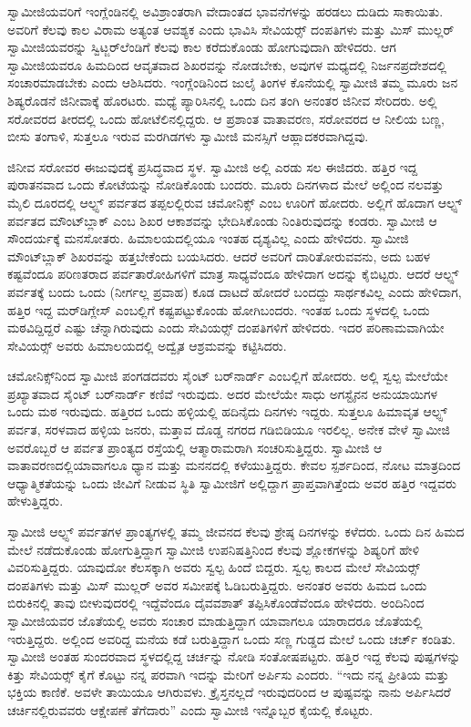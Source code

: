  ಸ್ವಾಮೀಜಿಯವರಿಗೆ ಇಂಗ್ಲೆಂಡಿನಲ್ಲಿ ಅವಿಶ್ರಾಂತರಾಗಿ ವೇದಾಂತದ ಭಾವನೆಗಳನ್ನು ಹರಡಲು ದುಡಿದು ಸಾಕಾಯಿತು. ಅವರಿಗೆ ಕೆಲವು ಕಾಲ ವಿರಾಮ ಅತ್ಯಂತ ಆವಶ್ಯಕ ಎಂದು ಭಾವಿಸಿ ಸೇವಿಯರ್ಸ್‍‍ ದಂಪತಿಗಳು ಮತ್ತು ಮಿಸ್ ಮುಲ್ಲರ್ ಸ್ವಾಮೀಜಿಯವರನ್ನು ಸ್ವಿಟ್ಜರ್‌ಲೆಂಡಿಗೆ ಕೆಲವು ಕಾಲ ಕರೆದುಕೊಂಡು ಹೋಗುವುದಾಗಿ ಹೇಳಿದರು. ಆಗ ಸ್ವಾಮೀಜಿಯವರೂ ಹಿಮದಿಂದ ಆವೃತವಾದ ಶಿಖರವನ್ನು ನೋಡಬೇಕು, ಅವುಗಳ ಮಧ್ಯದಲ್ಲಿ ನಿರ್ಜನಪ್ರದೇಶದಲ್ಲಿ ಸಂಚಾರಮಾಡಬೇಕು ಎಂದು ಆಶಿಸಿದರು. ಇಂಗ್ಲೆಂಡಿನಿಂದ ಜುಲೈ ತಿಂಗಳ ಕೊನೆಯಲ್ಲಿ ಸ್ವಾಮೀಜಿ ತಮ್ಮ ಮೂರು ಜನ ಶಿಷ್ಯರೊಡನೆ ಜಿನೀವಾಕ್ಕೆ ಹೊರಟರು. ಮಧ್ಯೆ ಪ್ಯಾರಿಸಿನಲ್ಲಿ ಒಂದು ದಿನ ತಂಗಿ ಅನಂತರ ಜಿನೀವ ಸೇರಿದರು. ಅಲ್ಲಿ ಸರೋವರದ ತೀರದಲ್ಲಿ ಒಂದು ಹೋಟೆಲಿನಲ್ಲಿದ್ದರು. ಆ ಪ್ರಶಾಂತ ವಾತಾವರಣ, ಸರೋವರದ ಆ ನೀಲಿಯ ಬಣ್ಣ, ಬೀಸು ತಂಗಾಳಿ, ಸುತ್ತಲೂ ಇರುವ ಮರಗಿಡಗಳು ಸ್ವಾಮೀಜಿ ಮನಸ್ಸಿಗೆ ಆಹ್ಲಾದಕರವಾಗಿದ್ದವು. 

 ಜಿನೀವ ಸರೋವರ ಈಜುವುದಕ್ಕೆ ಪ್ರಸಿದ್ಧವಾದ ಸ್ಥಳ. ಸ್ವಾಮೀಜಿ ಅಲ್ಲಿ ಎರಡು ಸಲ ಈಜಿದರು. ಹತ್ತಿರ ಇದ್ದ ಪುರಾತನವಾದ ಒಂದು ಕೋಟೆಯನ್ನು ನೋಡಿಕೊಂಡು ಬಂದರು. ಮೂರು ದಿನಗಳಾದ ಮೇಲೆ ಅಲ್ಲಿಂದ ನಲವತ್ತು ಮೈಲಿ ದೂರದಲ್ಲಿ ಆಲ್ಫ್ಸ್ ಪರ್ವತದ ತಪ್ಪಲಲ್ಲಿರುವ ಚಮೋನಿಕ್ಸ್ ಎಂಬ ಊರಿಗೆ ಹೋದರು. ಅಲ್ಲಿಗೆ ಹೊದಾಗ ಆಲ್ಫ್ಸ್ ಪರ್ವತದ ಮೌಂಟ್‍ಬ್ಲಾಕ್ ಎಂಬ ಶಿಖರ ಆಕಾಶವನ್ನು ಭೇದಿಸಿಕೊಂಡು ನಿಂತಿರುವುದನ್ನು ಕಂಡರು. ಸ್ವಾಮೀಜಿ ಆ ಸೌಂದರ್ಯಕ್ಕೆ ಮನಸೋತರು. ಹಿಮಾಲಯದಲ್ಲಿಯೂ ಇಂತಹ ದೃಶ್ಯವಿಲ್ಲ ಎಂದು ಹೇಳಿದರು. ಸ್ವಾಮೀಜಿ ಮೌಂಟ್‍ಬ್ಲಾಕ್ ಶಿಖರವನ್ನು ಹತ್ತಬೇಕೆಂದು ಬಯಸಿದರು. ಆದರೆ ಅವರಿಗೆ ದಾರಿತೋರುವವನು, ಅದು ಬಹಳ ಕಷ್ಟವೆಂದೂ ಪರಿಣತರಾದ ಪರ್ವತಾರೋಹಿಗಳಿಗೆ ಮಾತ್ರ ಸಾಧ್ಯವೆಂದೂ ಹೇಳಿದಾಗ ಅದನ್ನು ಕೈಬಿಟ್ಟರು. ಆದರೆ ಆಲ್ಫ್ಸ್ ಪರ್ವತಕ್ಕೆ ಬಂದು ಒಂದು (ನೀರ್ಗಲ್ಲ ಪ್ರವಾಹ) ಕೂಡ ದಾಟದೆ ಹೋದರೆ ಬಂದದ್ದು ಸಾರ್ಥಕವಿಲ್ಲ ಎಂದು ಹೇಳಿದಾಗ, ಹತ್ತಿರ ಇದ್ದ ಮರ್‌ಡಿಗ್ಲೇಸ್ ಎಂಬಲ್ಲಿಗೆ ಕಷ್ಟಪಟ್ಟುಕೊಂಡು ಹೋಗಿಬಂದರು. ಇಂತಹ ಒಂದು ಸ್ಥಳದಲ್ಲಿ ಒಂದು ಮಠವಿದ್ದಿದ್ದರೆ ಎಷ್ಟು ಚೆನ್ನಾಗಿರುವುದು ಎಂದು ಸೇವಿಯರ್ಸ್‍‍ ದಂಪತಿಗಳಿಗೆ ಹೇಳಿದರು. ಇದರ ಪರಿಣಾಮವಾಗಿಯೇ ಸೇವಿಯರ್ಸ್‍‍ ಅವರು ಹಿಮಾಲಯದಲ್ಲಿ ಅದ್ವೈತ ಆಶ್ರಮವನ್ನು ಕಟ್ಟಿಸಿದರು. 

 ಚಮೋನಿಕ್ಸ್‌ನಿಂದ ಸ್ವಾಮೀಜಿ ಪಂಗಡದವರು ಸೈಂಟ್ ಬರ್‌ನಾರ್ಡ್ ಎಂಬಲ್ಲಿಗೆ ಹೋದರು. ಅಲ್ಲಿ ಸ್ವಲ್ಪ ಮೇಲೆಯೇ ಪ್ರಖ್ಯಾತವಾದ ಸೈಂಟ್ ಬರ್‌ನಾರ್ಡ್ ಕಣಿವೆ ಇರುವುದು. ಅದರ ಮೇಲೆಯೇ ಸಾಧು ಅಗಸ್ಟೈನನ ಅನುಯಾಯಿಗಳ ಒಂದು ಮಠ ಇರುವುದು. ಹತ್ತಿರದ ಒಂದು ಹಳ್ಳಿಯಲ್ಲಿ ಹದಿನೈದು ದಿನಗಳು ಇದ್ದರು. ಸುತ್ತಲೂ ಹಿಮಾವೃತ ಆಲ್ಫ್ಸ್ ಪರ್ವತ, ಸರಳವಾದ ಹಳ್ಳಿಯ ಜನರು, ಮತ್ತಾವ ದೊಡ್ಡ ನಗರದ ಗಡಿಬಿಡಿಯೂ ಇರಲಿಲ್ಲ. ಅನೇಕ ವೇಳೆ ಸ್ವಾಮೀಜಿ ಅವರೊಬ್ಬರೆ ಆ ಪರ್ವತ ಪ್ರಾಂತ್ಯದ ರಸ್ತೆಯಲ್ಲಿ ಆತ್ಮಾರಾಮರಾಗಿ ಸಂಚರಿಸುತ್ತಿದ್ದರು. ಸ್ವಾಮೀಜಿ ಆ ವಾತಾವರಣದಲ್ಲಿ\break ಯಾವಾಗಲೂ ಧ್ಯಾನ ಮತ್ತು ಮನನದಲ್ಲಿ ಕಳೆಯುತ್ತಿದ್ದರು. ಕೇವಲ ಸ್ಪರ್ಶದಿಂದ, ನೋಟ ಮಾತ್ರದಿಂದ ಆಧ್ಯಾತ್ಮಿಕತೆಯನ್ನು ಒಂದು ಜೀವಿಗೆ ನೀಡುವ ಸ್ಥಿತಿ ಸ್ವಾಮೀಜಿಗೆ ಅಲ್ಲಿದ್ದಾಗ ಪ್ರಾಪ್ತವಾಗಿತ್ತೆಂದು ಅವರ ಹತ್ತಿರ ಇದ್ದವರು ಹೇಳುತ್ತಿದ್ದರು. 

 ಸ್ವಾಮೀಜಿ ಆಲ್ಫ್ಸ್ ಪರ್ವತಗಳ ಪ್ರಾಂತ್ಯಗಳಲ್ಲಿ ತಮ್ಮ ಜೀವನದ ಕೆಲವು ಶ್ರೇಷ್ಠ ದಿನಗಳನ್ನು ಕಳೆದರು. ಒಂದು ದಿನ ಹಿಮದ ಮೇಲೆ ನಡೆದುಕೊಂಡು ಹೋಗುತ್ತಿದ್ದಾಗ ಸ್ವಾಮೀಜಿ ಉಪನಿಷತ್ತಿನಿಂದ ಕೆಲವು ಶ್ಲೋಕಗಳನ್ನು ಶಿಷ್ಯರಿಗೆ ಹೇಳಿ ವಿವರಿಸುತ್ತಿದ್ದರು. ಯಾವುದೋ ಕೆಲಸಕ್ಕಾಗಿ ಅವರು ಸ್ವಲ್ಪ ಹಿಂದೆ ಬಿದ್ದರು. ಸ್ವಲ್ಪ ಕಾಲದ ಮೇಲೆ ಸೇವಿಯರ್ಸ್‍‍ ದಂಪತಿಗಳು ಮತ್ತು ಮಿಸ್ ಮುಲ್ಲರ್ ಅವರ ಸಮೀಪಕ್ಕೆ ಓಡಿಬರುತ್ತಿದ್ದರು. ಅನಂತರ ಅವರು ಹಿಮದ ಒಂದು ಬಿರುಕಿನಲ್ಲಿ ತಾವು ಬೀಳುವುದರಲ್ಲಿ ಇದ್ದೆವೆಂದೂ ದೈವವಶಾತ್ ತಪ್ಪಿಸಿಕೊಂಡೆವೆಂದೂ ಹೇಳಿದರು. ಅಂದಿನಿಂದ ಸ್ವಾಮೀಜಿಯವರ ಜೊತೆಯಲ್ಲಿ ಅವರು ಸಂಚಾರ ಮಾಡುತ್ತಿದ್ದಾಗ ಯಾವಾಗಲೂ ಯಾರಾದರೂ ಜೊತೆಯಲ್ಲಿ ಇರುತ್ತಿದ್ದರು. ಅಲ್ಲಿಂದ ಅವರಿದ್ದ ಮನೆಯ ಕಡೆ ಬರುತ್ತಿದ್ದಾಗ ಒಂದು ಸಣ್ಣ ಗುಡ್ಡದ ಮೇಲೆ ಒಂದು ಚರ್ಚ್ ಕಂಡಿತು. ಸ್ವಾಮೀಜಿ ಅಂತಹ ಸುಂದರವಾದ ಸ್ಥಳದಲ್ಲಿದ್ದ ಚರ್ಚನ್ನು ನೋಡಿ ಸಂತೋಷಪಟ್ಟರು. ಹತ್ತಿರ ಇದ್ದ ಕೆಲವು ಪುಷ್ಪಗಳನ್ನು ಕಿತ್ತು ಸೇವಿಯರ್ಸ್‍‍ ಕೈಗೆ ಕೊಟ್ಟು ನನ್ನ ಪರವಾಗಿ ಇದನ್ನು ಮೇರಿಗೆ ಅರ್ಪಿಸು ಎಂದರು. “ಇದು ನನ್ನ ಪ್ರೀತಿಯ ಮತ್ತು ಭಕ್ತಿಯ ಕಾಣಿಕೆ. ಅವಳೇ ತಾಯಿಯೂ ಆಗಿರುವಳು. ಕ್ರೈಸ್ತನಲ್ಲದೆ ಇರುವುದರಿಂದ ಆ ಪುಷ್ಪವನ್ನು ನಾನು ಅರ್ಪಿಸಿದರೆ ಚರ್ಚಿನಲ್ಲಿರುವವರು ಆಕ್ಷೇಪಣೆ ತೆಗೆದಾರು” ಎಂದು ಸ್ವಾಮೀಜಿ ಇನ್ನೊಬ್ಬರ ಕೈಯಲ್ಲಿ ಕೊಟ್ಟರು. 

